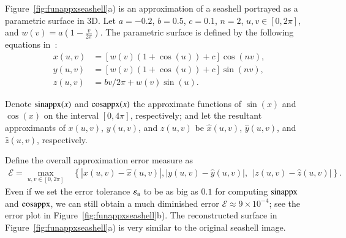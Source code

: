 \begin{exmp}
 
Figure~\ref{fig:funappxseashell}a) is an approximation of a 
seashell portrayed as a parametric surface in 3D. Let $a=-0.2$, $b=0.5$,
$c=0.1$, $n = 2$, $u,v \in [0, 2 \pi]$, and $w(v) =
a\left(1-\frac{v}{2\pi}\right)$. The parametric surface is defined by the
following equations in~\cite{DavEtal05}:
\begin{align*}
x(u,v) & =   \left[ w(v) \left(1+\cos(u)\right) + c\right]\cos(nv),\\
y(u,v) & = \left[w(v) (1+\cos(u)) + c\right] \sin(nv),\\
z(u,v) & = {bv}/{2\pi} + w(v)\sin(u).
\end{align*}
%

Denote $\operatorname*{sinappx}(x)$ and $\operatorname*{cosappx} (x)$ the approximate functions of $\sin(x)$ and
$\cos(x)$ on the interval $[0,4\pi]$, respectively; and let the resultant
approximants of $x(u,v)$, $y(u,v)$, and $z(u,v)$ be $\hat{x}(u,v)$,
$\hat{y}(u,v)$, and $\hat{z}(u,v)$, respectively.

Define the overall approximation error measure as
\begin{align*}
\mathscr{E} =  \max\limits_{u,v \in [0, 2 \pi] } & \left\{   |x(u,v)-\hat{x}(u,v)|,\right.
   \left.  |y(u,v)-\hat{y}(u,v)|, 
                                  \ \    |z(u,v)-\hat{z}(u,v)|\right\}.
\end{align*}
Even if we set the error tolerance $\varepsilon_{\textrm{a}}$ to be as big as $0.1$ for computing
$\operatorname*{sinappx}$ and $\operatorname*{cosappx}$, we can still obtain a much diminished error
$\mathscr{E}\approx 9 \times 10^{-4}$; see the error plot in
Figure~\ref{fig:funappxseashell}b). The reconstructed surface in
Figure~\ref{fig:funappxseashell}a) is very similar to the original seashell
image.
\end{exmp}

